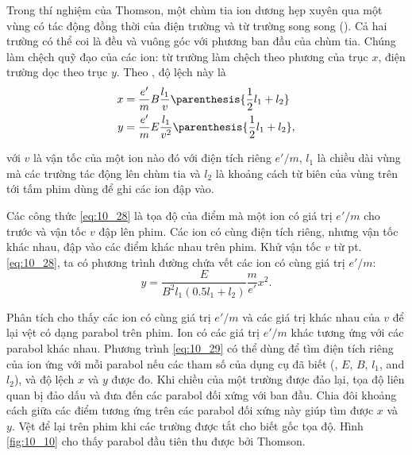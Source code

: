 Trong thí nghiệm của Thomson, một chùm tia ion dương hẹp xuyên qua một vùng có tác động đồng thời của điện trường và từ trường song song ().
Cả hai trường có thể coi là đều và vuông góc với phương ban đầu của chùm tia.
Chúng làm chệch quỹ đạo của các ion: từ trường làm chệch theo phương của trục $x$, điện trường dọc theo trục $y$.
Theo , độ lệch này là
\begin{equation}\label{eq:10_28}
    \begin{split}
        x &= \frac{e'}{m} B \frac{l_1}{v} \parenthesis{\frac{1}{2} l_1 + l_2}\\
        y &= \frac{e'}{m} E \frac{l_1}{v^2} \parenthesis{\frac{1}{2} l_1 + l_2},
    \end{split}
\end{equation}

\noindent
với $v$ là vận tốc của một ion nào đó với điện tích riêng $e'/m$, $l_1$ là chiều dài vùng mà các trường tác động lên chùm tia và $l_2$ là khoảng cách từ biên của vùng trên tới tấm phim dùng để ghi các ion đập vào.

Các công thức \eqref{eq:10_28} là tọa độ của điểm mà một ion có giá trị $e'/m$ cho trước và vận tốc $v$ đập lên phim.
Các ion có cùng điện tích riêng, nhưng vận tốc khác nhau, đập vào các điểm khác nhau trên phim.
Khử vận tốc $v$ từ pt. \eqref{eq:10_28}, ta có phương trình đường chứa vết các ion có cùng giá trị $e'/m$:
\begin{equation}\label{eq:10_29}
    y = \frac{E}{B^2 l_1 (0.5 l_1 + l_2)} \frac{m}{e'} x^2.
\end{equation}

Phân tích  cho thấy các ion có cùng giá trị $e'/m$ và các giá trị khác nhau của $v$ để lại vệt có dạng parabol trên phim.
Ion có các giá trị $e'/m$ khác tương ứng với các parabol khác nhau.
Phương trình \eqref{eq:10_29} có thể dùng để tìm điện tích riêng của ion ứng với mỗi parabol nếu các tham số của dụng cụ đã biết (\ie, $E$, $B$, $l_1$, and $l_2$), và độ lệch $x$ và $y$ được đo.
Khi chiều của một trường được đảo lại, tọa độ liên quan bị đảo dấu và đưa đến các parabol đối xứng với ban đầu.
Chia đôi khoảng cách giữa các điểm tương ứng trên các parabol đối xứng này giúp tìm được $x$ và $y$.
Vệt để lại trên phim khi các trường được tắt cho biết gốc tọa độ. Hình \ref{fig:10_10} cho thấy parabol đầu tiên thu được bởi Thomson.

